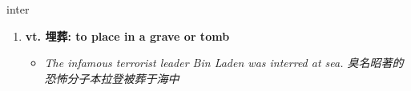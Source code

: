 
\begin{frame}
{\huge inter}
\begin{center}
\begin{enumerate}\Large
  \item \textbf{vt. 埋葬: to place in a grave or tomb}
  \begin{itemize}
    \item \em{\Large{The infamous terrorist leader Bin Laden was interred at sea. 臭名昭著的恐怖分子本拉登被葬于海中}}
  \end{itemize}
\end{enumerate}
\end{center}
\end{frame}
